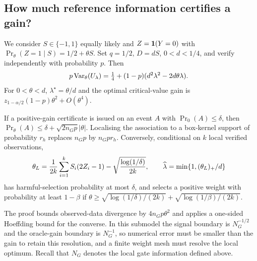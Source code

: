 \subsection{How much reference information certifies a gain?}
We consider $S\in\{-1,1\}$ equally likely and $Z=\mathbf 1(Y=0)$ with
$\Pr_\theta(Z=1\mid S)=1/2+\theta S$. Set $q=1/2$, $D=dS$, $0<d<1/4$, and verify independently with probability $p$. Then
\begin{equation}\label{eq:binary}
 p\operatorname{Var}_\theta(U_\lambda)=\tfrac14+(1-p)(d^2\lambda^2-2d\theta\lambda).
\end{equation}
For $0<\theta<d$, $\lambda^\star=\theta/d$ and the optimal critical-value gain is
$z_{1-\alpha/2}(1-p)\theta^2+O(\theta^4)$.

\begin{theorem}\label{th:boundary}
If a positive-gain certificate is issued on an event $A$ with $\Pr_0(A)\leq\delta$, then
$\Pr_\theta(A)\leq\delta+\sqrt{2n_Gp}|\theta|$.
Localising the association to a box-kernel support of probability $r_h$ replaces $n_Gp$ by $n_Gpr_h$. Conversely, conditional on $k$ local verified observations,
\begin{equation}\label{eq:binarycert}
 \theta_L=\frac1{2k}\sum_{i=1}^k S_i(2Z_i-1)
        -\sqrt{\frac{\log(1/\delta)}{2k}},\qquad
 \widehat\lambda=\min\{1,(\theta_L)_+/d\}
\end{equation}
has harmful-selection probability at most $\delta$, and selects a positive weight with probability at least $1-\beta$ if
$\theta\geq\sqrt{\log(1/\delta)/(2k)}+\sqrt{\log(1/\beta)/(2k)}$.
\end{theorem}

\begin{remark}\label{rem:scales}
The proof bounds observed-data divergence by $4n_Gp\theta^2$ and applies a one-sided Hoeffding bound for the converse. In this submodel the signal boundary is $N_G^{-1/2}$ and the oracle-gain boundary is $N_G^{-1}$, so numerical error must be smaller than the gain to retain this resolution, and a finite weight mesh must resolve the local optimum. Recall that $N_G$ denotes the local gate information defined above.
\end{remark}


